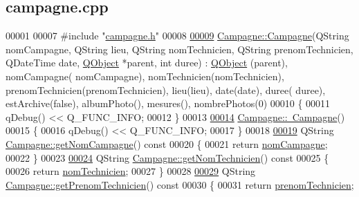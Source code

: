\hypertarget{campagne_8cpp_source}{}\subsection{campagne.\+cpp}
\label{campagne_8cpp_source}

\begin{DoxyCode}
00001 
00007 \textcolor{preprocessor}{#include "\hyperlink{campagne_8h}{campagne.h}"}
00008 
\hyperlink{class_campagne_aba78ce7d7b921053abc69e22789ec6da}{00009} \hyperlink{class_campagne_aba78ce7d7b921053abc69e22789ec6da}{Campagne::Campagne}(QString nomCampagne, QString lieu, QString nomTechnicien, QString 
      prenomTechnicien, QDateTime date, \hyperlink{class_q_object}{QObject} *parent, \textcolor{keywordtype}{int} duree) : \hyperlink{class_q_object}{QObject} (parent), nomCampagne(
      nomCampagne), nomTechnicien(nomTechnicien), prenomTechnicien(prenomTechnicien), lieu(lieu), date(date), duree(
      duree), estArchive(false), albumPhoto(), mesures(), nombrePhotos(0)
00010 \{
00011     qDebug() << Q\_FUNC\_INFO;
00012 \}
00013 
\hyperlink{class_campagne_a250c1d51fba057efbd7d1f66dce7c6e9}{00014} \hyperlink{class_campagne_a250c1d51fba057efbd7d1f66dce7c6e9}{Campagne::~Campagne}()
00015 \{
00016     qDebug() << Q\_FUNC\_INFO;
00017 \}
00018 
\hyperlink{class_campagne_a99a682fcb8e5a3f8c2aff7a44eb2c930}{00019} QString \hyperlink{class_campagne_a99a682fcb8e5a3f8c2aff7a44eb2c930}{Campagne::getNomCampagne}()\textcolor{keyword}{ const}
00020 \textcolor{keyword}{}\{
00021     \textcolor{keywordflow}{return} \hyperlink{class_campagne_a4455078418041442fa3998b9b6cb6230}{nomCampagne};
00022 \}
00023 
\hyperlink{class_campagne_ae1df1bd6234222ccdaf5a1d20d64ee46}{00024} QString \hyperlink{class_campagne_ae1df1bd6234222ccdaf5a1d20d64ee46}{Campagne::getNomTechnicien}()\textcolor{keyword}{ const}
00025 \textcolor{keyword}{}\{
00026     \textcolor{keywordflow}{return} \hyperlink{class_campagne_a6d3e88fb93b38cbcf1bc53cc9fc30f2f}{nomTechnicien};
00027 \}
00028 
\hyperlink{class_campagne_ac6c7772ef5d7b15964664d659b486263}{00029} QString \hyperlink{class_campagne_ac6c7772ef5d7b15964664d659b486263}{Campagne::getPrenomTechnicien}()\textcolor{keyword}{ const}
00030 \textcolor{keyword}{}\{
00031     \textcolor{keywordflow}{return} \hyperlink{class_campagne_a9cc37c9671136683b5dac87ff34017bc}{prenomTechnicien};

\end{DoxyCode}
